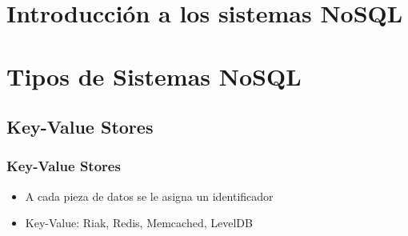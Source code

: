 \documentclass[14pt]{beamer}
\begin{document}



\section{Introducción a los sistemas NoSQL}



\section{Tipos de Sistemas NoSQL}

\subsection{Key-Value Stores}

\begin{frame}
  \frametitle{Key-Value Stores}
\begin{itemize}
\item A cada pieza de datos se le asigna un identificador
\item Key-Value: Riak, Redis, Memcached, LevelDB
\end{itemize}
\end{frame}
\end{document}
